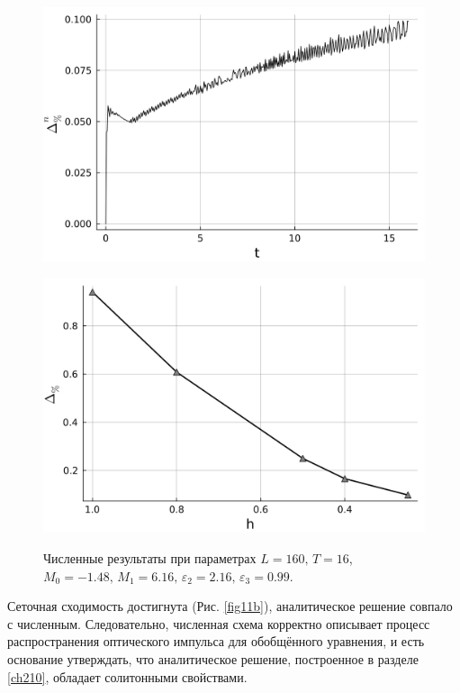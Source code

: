 \documentclass[14pt,a4paper]{extreport}
\begin{document}
			\begin{figure}[H]
				\begin{center}
					\begin{minipage}[h]{0.48\linewidth} %
						\includegraphics[width=1\linewidth]{Medvedev_fig7.png}
						\label{fig11a}
					\end{minipage}
					\hfill
					\begin{minipage}[h]{0.48\linewidth}
						\includegraphics[width=1\linewidth]{Medvedev_fig15.png}
						\label{fig11b}
					\end{minipage}
				\end{center}
				\caption{Численные результаты при параметрах
				\(L=160,\, T=16\), 
				\(M_{0}=-1.48,\, M_{1}=6.16,\,\varepsilon_{2}=2.16,\,\varepsilon_{3}=0.99\).}
				\label{fig11}
			\end{figure}
			Сеточная сходимость достигнута (Рис. \ref{fig11b}), аналитическое решение совпало с численным. Следовательно, численная схема корректно описывает процесс распространения оптического импульса для обобщённого уравнения, и есть основание утверждать, что аналитическое решение, построенное в разделе \ref{ch210}, обладает солитонными свойствами.
\end{document}
